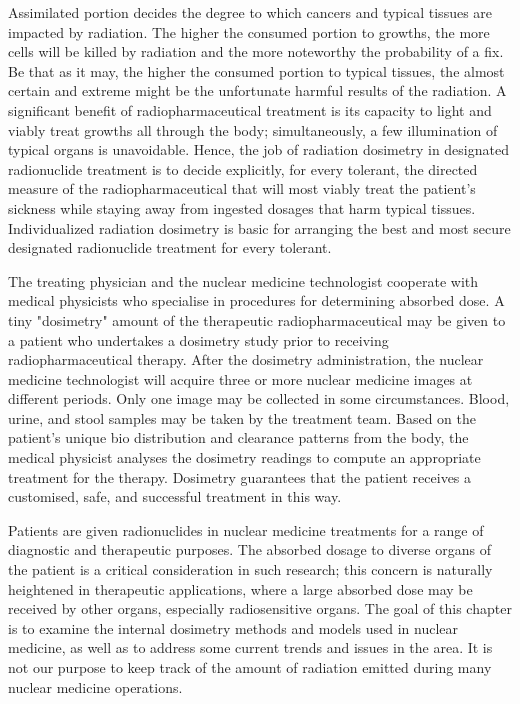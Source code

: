 \documentclass[12pt]{article}
\begin{document}
\par
Assimilated portion decides the degree to which cancers and typical tissues are impacted by radiation. The higher the consumed portion to growths, the more cells will be killed by radiation and the more noteworthy the probability of a fix. Be that as it may, the higher the consumed portion to typical tissues, the almost certain and extreme might be the unfortunate harmful results of the radiation. A significant benefit of radiopharmaceutical treatment is its capacity to light and viably treat growths all through the body; simultaneously, a few illumination of typical organs is unavoidable. Hence, the job of radiation dosimetry in designated radionuclide treatment is to decide explicitly, for every tolerant, the directed measure of the radiopharmaceutical that will most viably treat the patient's sickness while staying away from ingested dosages that harm typical tissues. Individualized radiation dosimetry is basic for arranging the best and most secure designated radionuclide treatment for every tolerant.
\par
The treating physician and the nuclear medicine technologist cooperate with medical physicists who specialise in procedures for determining absorbed dose. A tiny "dosimetry" amount of the therapeutic radiopharmaceutical may be given to a patient who undertakes a dosimetry study prior to receiving radiopharmaceutical therapy. After the dosimetry administration, the nuclear medicine technologist will acquire three or more nuclear medicine images at different periods. Only one image may be collected in some circumstances. Blood, urine, and stool samples may be taken by the treatment team. Based on the patient's unique bio distribution and clearance patterns from the body, the medical physicist analyses the dosimetry readings to compute an appropriate treatment for the therapy. Dosimetry guarantees that the patient receives a customised, safe, and successful treatment in this way.
\par
Patients are given radionuclides in nuclear medicine treatments for a range of diagnostic and therapeutic purposes. The absorbed dosage to diverse organs of the patient is a critical consideration in such research; this concern is naturally heightened in therapeutic applications, where a large absorbed dose may be received by other organs, especially radiosensitive organs. The goal of this chapter is to examine the internal dosimetry methods and models used in nuclear medicine, as well as to address some current trends and issues in the area. It is not our purpose to keep track of the amount of radiation emitted during many nuclear medicine operations.
\end{document}
